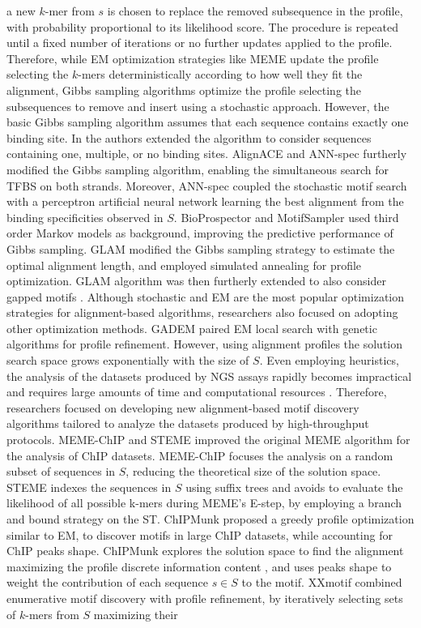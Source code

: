 \documentclass[a4paper, titlepage, openright]{book}
\begin{document}
a new $k$-mer from $s$ is chosen to replace the removed subsequence in the profile, with probability proportional to its likelihood score. The procedure is repeated until a fixed number of iterations or no further updates applied to the profile. Therefore, while EM optimization strategies like MEME update the profile selecting the $k$-mers deterministically according to how well they fit the alignment, Gibbs sampling algorithms optimize the profile selecting the subsequences to remove and insert using a stochastic approach. However, the basic Gibbs sampling algorithm assumes that each sequence contains exactly one binding site. In \citep{neuwald1995gibbs} the authors extended the algorithm to consider sequences containing one, multiple, or no binding sites. AlignACE \citep{hughes2000computational} and ANN-spec \citep{workman1999ann} furtherly modified the Gibbs sampling algorithm, enabling the simultaneous search for TFBS on both strands. Moreover, ANN-spec coupled the stochastic motif search with a perceptron artificial neural network learning the best alignment from the binding specificities observed in $S$. BioProspector \citep{liu2000bioprospector} and MotifSampler \citep{thijs2001higher} used third order Markov models as background, improving the predictive performance of Gibbs sampling. GLAM \citep{frith2004finding} modified the Gibbs sampling strategy to estimate the optimal alignment length, and employed simulated annealing for profile optimization. GLAM algorithm was then furtherly extended to also consider gapped motifs \citep{frith2008discovering}. Although stochastic and EM are the most popular optimization strategies for alignment-based algorithms, researchers also focused on adopting other optimization methods. GADEM \citep{li2009gadem} paired EM local search with genetic algorithms for profile refinement. However, using alignment profiles the solution search space grows exponentially with the size of $S$. Even employing heuristics, the analysis of the datasets produced by NGS assays rapidly becomes impractical and requires large amounts of time and computational resources \citep{zambelli2013motif}. Therefore, researchers focused on developing new alignment-based motif discovery algorithms tailored to analyze the datasets produced by high-throughput protocols. MEME-ChIP \citep{machanick2011meme} and STEME \citep{reid2011steme} improved the original MEME algorithm for the analysis of ChIP datasets. MEME-ChIP focuses the analysis on a random subset of sequences in $S$, reducing the theoretical size of the solution space. STEME indexes the sequences in $S$ using suffix trees and avoids to evaluate the likelihood of all possible k-mers during MEME’s E-step, by employing a branch and bound strategy on the ST. ChIPMunk \citep{kulakovskiy2010deep} proposed a greedy profile optimization similar to EM, to discover motifs in large ChIP datasets, while accounting for ChIP peaks shape. ChIPMunk explores the solution space to find the alignment maximizing the profile discrete information content \citep{kulakovskiy2009discovery}, and uses peaks shape to weight the contribution of each sequence $s \in S$ to the motif. XXmotif \citep{hartmann2013p} combined enumerative motif discovery with profile refinement, by iteratively selecting sets of $k$-mers from $S$ maximizing their 
\end{document}
